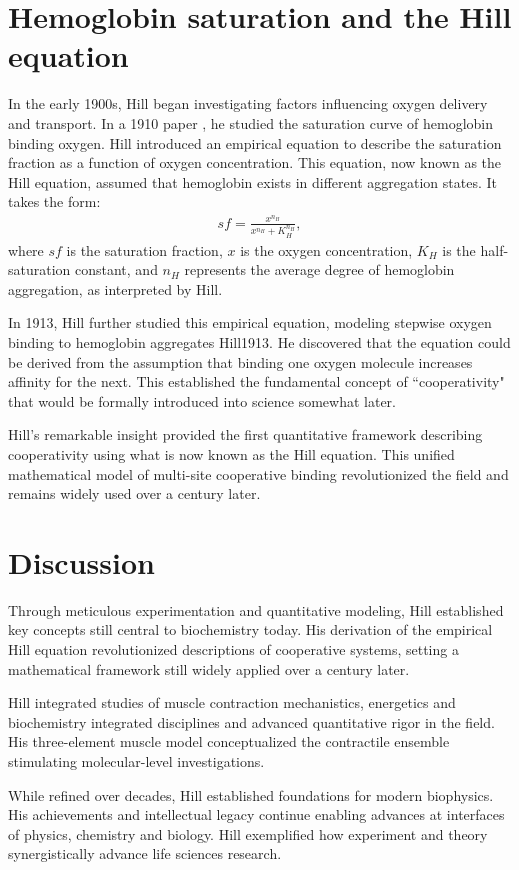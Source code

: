 \section{Hemoglobin saturation and the Hill equation}

In the early 1900s, Hill began investigating factors influencing oxygen delivery and transport. In a 1910 paper \citep{Hill1910}, he studied the saturation curve of hemoglobin binding oxygen. Hill introduced an empirical equation to describe the saturation fraction as a function of oxygen concentration. This equation, now known as the Hill equation, assumed that hemoglobin exists in different aggregation states. It takes the form:
\begin{align*}
    sf = \frac{x^{n_H}}{x^{n_H} + K_H^{n_H}}, 
\end{align*}
where $sf$ is the saturation fraction, $x$ is the oxygen concentration, $K_H$ is the half-saturation constant, and $n_H$ represents the average degree of hemoglobin aggregation, as interpreted by Hill.

In 1913, Hill further studied this empirical equation, modeling stepwise oxygen binding to hemoglobin aggregates Hill1913. He discovered that the equation could be derived from the assumption that binding one oxygen molecule increases affinity for the next. This established the fundamental concept of ``cooperativity" that would be formally introduced into science somewhat later.

Hill's remarkable insight provided the first quantitative framework describing cooperativity using what is now known as the Hill equation. This unified mathematical model of multi-site cooperative binding revolutionized the field and remains widely used over a century later.

\section{Discussion}

Through meticulous experimentation and quantitative modeling, Hill established key concepts still central to biochemistry today. His derivation of the empirical Hill equation revolutionized descriptions of cooperative systems, setting a mathematical framework still widely applied over a century later.

Hill integrated studies of muscle contraction mechanistics, energetics and biochemistry integrated disciplines and advanced quantitative rigor in the field. His three-element muscle model conceptualized the contractile ensemble stimulating molecular-level investigations.

While refined over decades, Hill established foundations for modern biophysics. His achievements and intellectual legacy continue enabling advances at interfaces of physics, chemistry and biology. Hill exemplified how experiment and theory synergistically advance life sciences research.